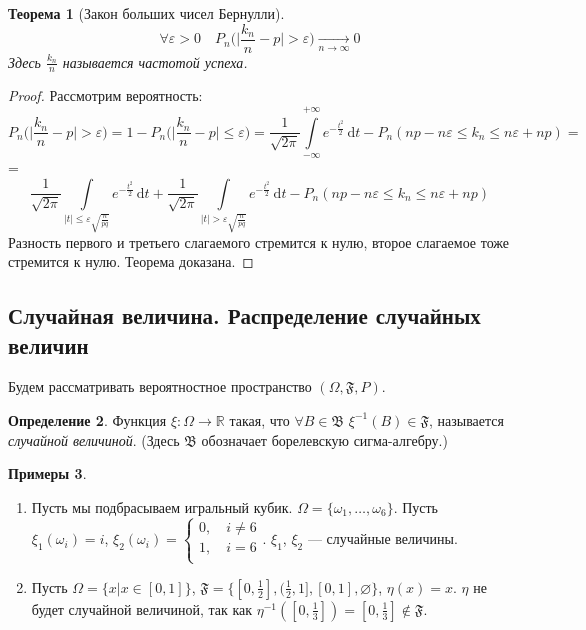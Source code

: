 \documentclass[11pt,openany,a4paper]{scrartcl}
\theoremstyle{plain}
\newtheorem{theorem}{Теорема}[subsection]
\theoremstyle{definition}
\newtheorem{definition}[theorem]{Определение}
\newtheorem{examples}[theorem]{Примеры}
\newcommand\mb{\mathbb}
\newcommand\real{\mb R}
\newcommand{\underto}[1]{\xrightarrow[#1]{}}
\newcommand{\dif}{\, \mathrm d}
\begin{document}
\begin{theorem}[Закон больших чисел Бернулли]\label{large_numbers_bernoulli}
    $$
    \forall \varepsilon > 0\quad P_n\bigg(\bigg|\frac{k_n}{n} -
    p\bigg| > \varepsilon\bigg)
    \underto{n \to \infty} 0
    $$
    Здесь $\frac{k_n}{n}$ называется частотой успеха.
\end{theorem}
\begin{proof}
    Рассмотрим вероятность:
    $$
    P_n\bigg(\bigg|\frac{k_n}{n} -
    p\bigg| > \varepsilon\bigg) = 1 - P_n\bigg(\bigg|\frac{k_n}{n} -
    p\bigg| \leqslant \varepsilon\bigg) =
    \frac{1}{\sqrt{2\pi}}
    \int\limits_{-\infty}^{+\infty}e^{-\frac{t^2}{2}} \dif t -
    P_n(np - n\varepsilon \leqslant k_n \leqslant n\varepsilon + np) =
    $$
    = $$
    \frac{1}{\sqrt{2\pi}}
    \int\limits_{|t|\leqslant \varepsilon \sqrt{\frac{n}{pq}}}
    e^{-\frac{t^2}{2}} \dif t + \frac{1}{\sqrt{2\pi}}
    \int\limits_{|t| > \varepsilon \sqrt{\frac{n}{pq}}}
    e^{-\frac{t^2}{2}} \dif t -
    P_n(np - n\varepsilon \leqslant k_n \leqslant n\varepsilon + np)
    $$
    Разность первого и третьего слагаемого стремится к нулю, второе слагаемое тоже
    стремится к нулю. Теорема доказана.
\end{proof}

\subsection{Случайная величина. Распределение случайных величин}

Будем рассматривать вероятностное пространство $(\Omega, \mathfrak{F}, P)$.

\begin{definition}
    Функция $\xi: \Omega \to \real$ такая, что
    $\forall B \in \mathfrak B$
    $\xi^{-1}(B) \in \mathfrak F$, называется \emph{случайной величиной}.
    (Здесь $\mathfrak B$ обозначает борелевскую сигма-алгебру.)
\end{definition}
\begin{examples}
    \begin{enumerate}
        \item Пусть мы подбрасываем игральный кубик.
        $\Omega = \{\omega_1,\ldots,\omega_6\}$. Пусть $\xi_1(\omega_i) = i$,
        $\xi_2(\omega_i) =
        \begin{cases}
            0,\quad i \neq 6\\
            1,\quad i = 6\\  
        \end{cases}
        $. $\xi_1$, $\xi_2$ — случайные величины.
        \item Пусть $\Omega = \{x \big| x \in [0, 1]\}$,
        $\mathfrak F = \{[0, \frac{1}{2}],
        (\frac{1}{2}, 1], [0, 1], \varnothing\}$,
        $\eta(x) = x$. $\eta$ не будет случайной величиной, так как
        $\eta^{-1}([0, \frac{1}{3}]) = [0, \frac{1}{3}] \notin \mathfrak F$.
    \end{enumerate}
\end{examples}
\end{document}
